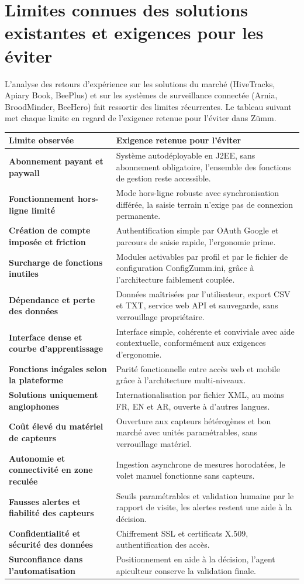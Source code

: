 \section{Limites connues des solutions existantes et exigences pour les éviter}
L'analyse des retours d'expérience sur les solutions du marché (HiveTracks,
Apiary Book, BeePlus) et sur les systèmes de surveillance connectée (Arnia,
BroodMinder, BeeHero) fait ressortir des limites récurrentes. Le tableau suivant
met chaque limite en regard de l'exigence retenue pour l'éviter dans Zümm.
\begin{longtable}{>{\bfseries}p{5.2cm} p{9.3cm}}
\toprule
\textbf{Limite observée} & \textbf{Exigence retenue pour l'éviter} \\
\midrule
\endhead
Abonnement payant et paywall & Système autodéployable en J2EE, sans abonnement obligatoire, l'ensemble des fonctions de gestion reste accessible. \\
Fonctionnement hors-ligne limité & Mode hors-ligne robuste avec synchronisation différée, la saisie terrain n'exige pas de connexion permanente. \\
Création de compte imposée et friction & Authentification simple par OAuth Google et parcours de saisie rapide, l'ergonomie prime. \\
Surcharge de fonctions inutiles & Modules activables par profil et par le fichier de configuration ConfigZumm.ini, grâce à l'architecture faiblement couplée. \\
Dépendance et perte des données & Données maîtrisées par l'utilisateur, export CSV et TXT, service web API et sauvegarde, sans verrouillage propriétaire. \\
Interface dense et courbe d'apprentissage & Interface simple, cohérente et conviviale avec aide contextuelle, conformément aux exigences d'ergonomie. \\
Fonctions inégales selon la plateforme & Parité fonctionnelle entre accès web et mobile grâce à l'architecture multi-niveaux. \\
Solutions uniquement anglophones & Internationalisation par fichier XML, au moins FR, EN et AR, ouverte à d'autres langues. \\
Coût élevé du matériel de capteurs & Ouverture aux capteurs hétérogènes et bon marché avec unités paramétrables, sans verrouillage matériel. \\
Autonomie et connectivité en zone reculée & Ingestion asynchrone de mesures horodatées, le volet manuel fonctionne sans capteurs. \\
Fausses alertes et fiabilité des capteurs & Seuils paramétrables et validation humaine par le rapport de visite, les alertes restent une aide à la décision. \\
Confidentialité et sécurité des données & Chiffrement SSL et certificats X.509, authentification des accès. \\
Surconfiance dans l'automatisation & Positionnement en aide à la décision, l'agent apiculteur conserve la validation finale. \\
\bottomrule
\end{longtable}

